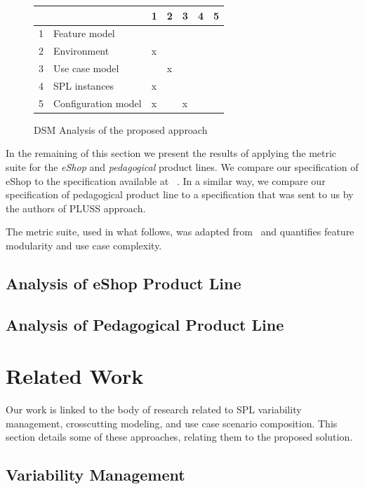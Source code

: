 \documentclass{acm_proc_article-sp}
\begin{document}
\begin{figure}[h]
\centering
\begin{small}
\begin{tabular}{lllllll} \hline
& & 1 & 2 & 3 & 4 & 5 \\ \hline
1 & Feature model 		& 	& 	&      &  	&  	\\ 
2 & Environment & x	&	&	&	&  	\\
3 & Use case model 	&  	&  x	&  	&  	& 	\\
4 & SPL instances 		& x 	& 	& 	&   	& 	\\
5 & Configuration model 	& x 	&  	&  x	&  	& 	\\  \hline
\end{tabular}
\end{small}
\caption{DSM Analysis of the proposed approach}
\label{dsm:cc}
\end{figure}   

 
In the remaining of this section we present the results of applying the metric suite for the \emph{eShop} and \emph{pedagogical} product lines. We compare our specification of eShop to the specification available at~\cite{eshop-url} .  In a similar way, we compare our specification of pedagogical product line to a specification that was sent to us by the authors of PLUSS approach. 

The metric suite, used in what follows, was adapted from~\cite{garcia-taosd-2005} and quantifies feature modularity and use case complexity. 

\subsection{Analysis of eShop Product Line}

\subsection{Analysis of Pedagogical Product Line}
 
\section{Related Work}
\label{sec:related}

Our work is linked to the body of research related to SPL
variability management, crosscutting modeling, and use case scenario
composition. This section details some of these approaches, relating
them to the proposed solution.

\subsection{Variability Management}
\end{document}
